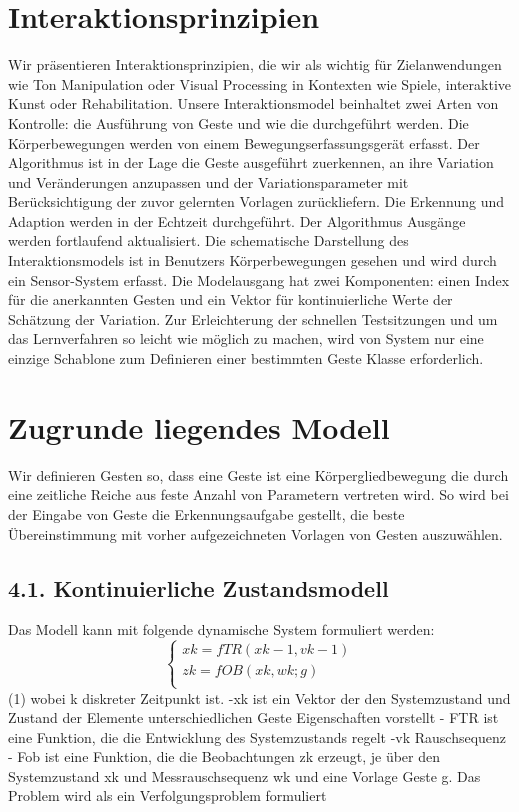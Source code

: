 \documentclass{llncs}
\begin{document}
\section{Interaktionsprinzipien}
Wir präsentieren Interaktionsprinzipien, die wir als wichtig für Zielanwendungen wie Ton Manipulation oder Visual Processing in Kontexten wie Spiele, interaktive Kunst oder Rehabilitation. Unsere Interaktionsmodel beinhaltet zwei Arten von Kontrolle: die Ausführung von Geste und wie die durchgeführt werden. Die Körperbewegungen werden von einem Bewegungserfassungsgerät erfasst. Der Algorithmus ist in der Lage die Geste ausgeführt zuerkennen, an ihre  Variation und Veränderungen anzupassen und der Variationsparameter mit Berücksichtigung der zuvor gelernten Vorlagen zurückliefern. Die Erkennung und Adaption werden in der Echtzeit durchgeführt. Der Algorithmus Ausgänge werden fortlaufend aktualisiert. Die schematische Darstellung des Interaktionsmodels ist in Benutzers Körperbewegungen gesehen und wird durch ein Sensor-System erfasst. Die Modelausgang hat zwei Komponenten:  einen Index für die anerkannten Gesten und ein Vektor für kontinuierliche Werte der Schätzung der Variation. Zur Erleichterung der schnellen Testsitzungen und um das Lernverfahren so leicht wie möglich zu machen, wird von System nur eine einzige Schablone zum Definieren einer bestimmten Geste Klasse erforderlich.

\section{Zugrunde liegendes Modell}
Wir definieren Gesten so, dass eine Geste ist eine Körpergliedbewegung die durch eine zeitliche Reiche aus feste Anzahl von Parametern vertreten wird. So wird bei der Eingabe von Geste die Erkennungsaufgabe gestellt, die beste Übereinstimmung mit vorher aufgezeichneten Vorlagen von Gesten auszuwählen.
\subsection{4.1. Kontinuierliche Zustandsmodell}
Das Modell kann mit folgende dynamische System formuliert werden:
\begin{equation}
\left\{\begin{array}{l}
xk = fTR(xk−1, vk−1)\\
zk = fOB(xk, wk; g)\\
\end{array}\right.
\end{equation} 										(1)
wobei k diskreter Zeitpunkt ist.
-xk ist ein Vektor der den Systemzustand und Zustand der Elemente unterschiedlichen Geste Eigenschaften vorstellt
-   FTR ist eine Funktion, die die Entwicklung des Systemzustands regelt
-vk Rauschsequenz
- Fob ist eine Funktion, die die Beobachtungen zk erzeugt, je über den Systemzustand xk und Messrauschsequenz wk und eine Vorlage Geste g.
Das Problem wird als ein Verfolgungsproblem formuliert
\end{document}
